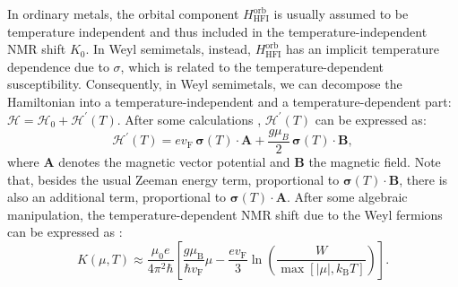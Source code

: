\documentclass[aps,prb,a4paper,10pt,twocolumn,showpacs,floatfix,superscriptaddress,preprintnumbers,longbibliography]{revtex4-2}
\begin{document}
In ordinary metals, the orbital component $H_{\mathrm{HFI}}^{\mathrm{orb}}$ is usually assumed to be temperature independent and thus included in the temperature-independent NMR shift $K_{0}$. 
In Weyl semimetals, instead, $H_{\mathrm{HFI}}^{\mathrm{orb}}$ has an implicit temperature dependence due to $\sigma$, which is related to the temperature-dependent susceptibility. Consequently, in Weyl semimetals, 
we can decompose the Hamiltonian into a tem\-pe\-ra\-ture\--independent 
and a temperature-dependent part: $\mathscr{H} = \mathscr{H}_{0} + \mathscr{H}^{\prime}(T)$. 
After some calculations 
\cite{Okvtovity2019nuclear}, $\mathscr{H}^{\prime}(T)$ can be expressed as: 
%
\begin{equation}
\mathscr{H}^{\prime}(T)=e v_\mathrm{F}\, \boldsymbol{\sigma}(T) \cdot \boldsymbol{A} 
+ \frac{g \mu_{B}}{2} \, \boldsymbol{\sigma}(T) \cdot \boldsymbol{B}, 
\label{eqn:externalfield}
\end{equation}
%
where $\boldsymbol{A}$ denotes the magnetic vector potential and $\boldsymbol{B}$  
the magnetic field. Note that, besides the usual Zeeman energy term, 
proportional to $\boldsymbol{\sigma}(T) \cdot \boldsymbol{B}$, there is 
also an additional term, proportional to $\boldsymbol{\sigma}(T) \cdot \boldsymbol{A}$. 
After some algebraic manipulation, the temperature-dependent NMR shift 
due to the Weyl fermions can be expressed as \cite{Okvtovity2019nuclear}: 
%
\begin{equation}
K(\mu, T) \approx \frac{\mu_{0} e}{4 \pi^{2} \hbar}\left[\frac{g \mu_\mathrm{B}}{\hbar v_\mathrm{F}} \mu - \frac{e v_\mathrm{F}}{3} \ln \left(\frac{W}{\max \left[|\mu|, k_\mathrm{B} T\right]}\right)\right].
\label{eqn:knightshiftmasterequation}
\end{equation}
%
%
\end{document}
